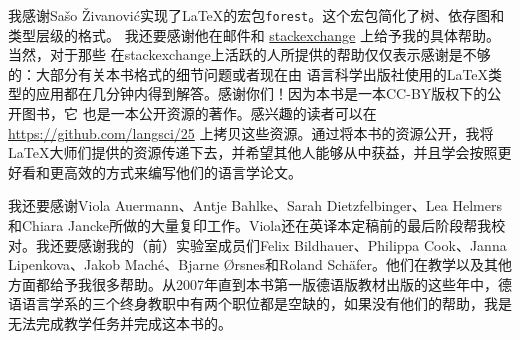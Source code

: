 我感谢Sašo Živanović实现了\LaTeX{}的宏包\texttt{forest}。这个宏包简化了树、依存图和类型层级的格式。
我还要感谢他在邮件和 \href{http://www.stackexchange.com}{stackexchange} 上给予我的具体帮助。当然，对于那些
在stackexchange上活跃的人所提供的帮助仅仅表示感谢是不够的：大部分有关本书格式的细节问题或者现在由
语言科学出版社使用的\LaTeX{}类型的应用都在几分钟内得到解答。感谢你们！因为本书是一本CC-BY版权下的公开图书，它
也是一本公开资源的著作。感兴趣的读者可以在 \url{https://github.com/langsci/25} 上拷贝这些资源。通过将本书的资源公开，我将\LaTeX{}大师们提供的资源传递下去，并希望其他人能够从中获益，并且学会按照更好看和更高效的方式来编写他们的语言学论文。

我还要感谢Viola Auermann、Antje Bahlke、Sarah Dietzfelbinger、Lea Helmers和Chiara Jancke所做的大量复印工作。Viola还在英译本定稿前的最后阶段帮我校对。我还要感谢我的（前）实验室成员们Felix Bildhauer、Philippa Cook、Janna Lipenkova、Jakob Maché、Bjarne Ørsnes和Roland Schäfer。他们在教学以及其他方面都给予我很多帮助。从2007年直到本书第一版德语版教材出版的这些年中，德语语言学系的三个终身教职中有两个职位都是空缺的，如果没有他们的帮助，我是无法完成教学任务并完成这本书的。



